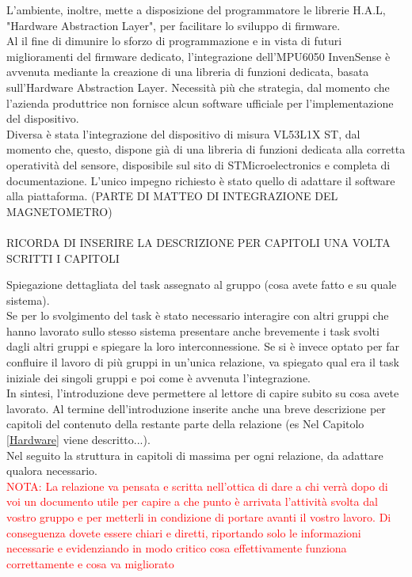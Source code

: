 \documentclass[11pt]{report}
\begin{document}
L'ambiente, inoltre, mette a disposizione del programmatore le librerie H.A.L, "Hardware Abstraction Layer", per facilitare lo sviluppo di firmware.\\
Al il fine di dimunire lo sforzo di programmazione e in vista di futuri miglioramenti del firmware dedicato, l'integrazione dell'MPU6050 InvenSense è avvenuta mediante la creazione di una libreria di funzioni dedicata, basata sull'Hardware Abstraction Layer. Necessità più che strategia, dal momento che l'azienda produttrice non fornisce alcun software ufficiale per l'implementazione del dispositivo.\\
Diversa è stata l'integrazione del dispositivo di misura VL53L1X ST, dal momento che, questo, dispone già di una libreria di funzioni dedicata alla corretta operatività del sensore, disposibile sul sito di STMicroelectronics e completa di documentazione. 
L'unico impegno richiesto è stato quello di adattare il software alla piattaforma.
(PARTE DI MATTEO DI INTEGRAZIONE DEL MAGNETOMETRO)\\\\
RICORDA DI INSERIRE LA DESCRIZIONE PER CAPITOLI UNA VOLTA SCRITTI I CAPITOLI 

Spiegazione dettagliata del task assegnato al gruppo (cosa avete fatto e su quale sistema).\\
Se per lo svolgimento del task è stato necessario interagire con altri gruppi che hanno lavorato sullo stesso sistema presentare anche brevemente i task svolti dagli altri gruppi e spiegare la loro interconnessione.
Se si è invece optato per far confluire il lavoro di più gruppi in un'unica relazione, va spiegato qual era il task iniziale dei singoli gruppi e poi come è avvenuta l'integrazione. \\
In sintesi, l'introduzione deve permettere al lettore di capire subito su cosa avete lavorato.
Al termine dell'introduzione inserite anche una breve descrizione per capitoli del contenuto della restante parte della relazione (es Nel Capitolo \ref{Hardware} viene descritto...). \\
\newline
Nel seguito la struttura in capitoli di massima per ogni relazione, da adattare qualora necessario. \\
\textcolor{red}{NOTA: La relazione va pensata e scritta nell'ottica di dare a chi verrà dopo di voi un documento utile per capire a che punto è arrivata l'attività svolta dal vostro gruppo e per metterli in condizione di portare avanti il vostro lavoro. Di conseguenza dovete essere chiari e diretti, riportando solo le informazioni necessarie e evidenziando in modo critico cosa effettivamente funziona correttamente e cosa va migliorato}
\end{document}
